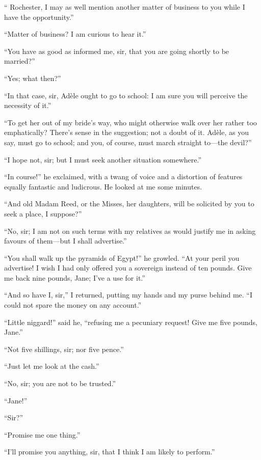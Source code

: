 \enquote{\Mr{} Rochester, I may as well mention another matter of business
to you while I have the opportunity.}

\enquote{Matter of business? I am curious to hear it.}

\enquote{You have as good as informed me, sir, that you are going
shortly to be married?}

\enquote{Yes; what then?}

\enquote{In that case, sir, Adèle ought to go to school: I am sure you
will perceive the necessity of it.}

\enquote{To get her out of my bride's way, who might otherwise walk over
her rather too emphatically? There's sense in the suggestion; not a
doubt of it. Adèle, as you say, must go to school; and you, of course,
must march straight to---the devil?}

\enquote{I hope not, sir; but I must seek another situation somewhere.}

\enquote{In course!} he exclaimed, with a twang of voice and a
distortion of features equally fantastic and ludicrous. He looked at me
some minutes.

\enquote{And old Madam Reed, or the Misses, her daughters, will be
solicited by you to seek a place, I suppose?}

\enquote{No, sir; I am not on such terms with my relatives as would
justify me in asking favours of them---but I shall advertise.}

\enquote{You shall walk up the pyramids of Egypt!} he growled. 
\enquote{At your peril you advertise! I wish I had only offered you a
sovereign instead of ten pounds. Give me back nine pounds, Jane; I've a
use for it.}

\enquote{And so have I, sir,} I returned, putting my hands and my purse
behind me. \enquote{I could not spare the money on any account.}

\enquote{Little niggard!} said he, \enquote{refusing me a pecuniary
request! Give me five pounds, Jane.}

\enquote{Not five shillings, sir; nor five pence.}

\enquote{Just let me look at the cash.}

\enquote{No, sir; you are not to be trusted.}

\enquote{Jane!}

\enquote{Sir?}

\enquote{Promise me one thing.}

\enquote{I'll promise you anything, sir, that I think I am likely to
perform.}

